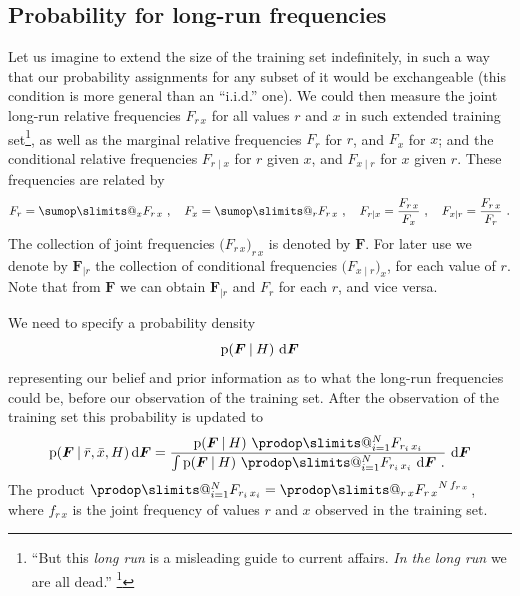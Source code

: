 \documentclass[\ifafour a4paper,12pt,\else a5paper,10pt,\fi%
onecolumn,oneside,article,%
british%
]{memoir}
\makeatletter
\theoremstyle{remark}
\theoremstyle{innote}
\def\sum{\DOTSI\sumop\slimits@}
\def\prod{\DOTSI\prodop\slimits@}
\newcommand*{\citep}{\footcites}
\newcommand*{\di}{\mathrm{d}}%
\newcommand*{\p}{\mathrm{p}}%
\renewcommand*{\|}[1][]{\nonscript\:#1\vert\nonscript\:\mathopen{}}
\renewcommand*{\=}{\TextOrMath\texteq\eq}
\newcommand*{\sect}{\S}%
\newcommand*{\q}{}%
\DeclareRobustCommand*{\q}{%
  \mathord{\mathpalette\bigcdot@{}}%
}
\newcommand*{\bigcdot@scalefactor}{0.7}
\newcommand*{\bigcdot@widthfactor}{1.5}
\newcommand*{\bigcdot@}[2]{%
  \sbox0{$#1\vcenter{}$}%
  \sbox2{$#1\cdot\m@th$}%
  \hbox to \bigcdot@widthfactor\wd2{%
    \hfil
    \raise\ht0\hbox{%
      \scalebox{\bigcdot@scalefactor}{%
        \lower\ht0\hbox{$#1\bullet\m@th$}%
      }%
    }%
    \hfil
  }%
}
\newcommand*{\rd}{\bar{r}}
\newcommand*{\xd}{\bar{x}}
\newcommand*{\yF}{\bm{F}}
\newcommand*{\yFr}{\yF_{\bm{\mid}r}}
\makeatother
\begin{document}
\subsection{Probability for long-run frequencies}
\label{sec:prob_longrun}

Let us imagine to extend the size of the training set indefinitely, in such
a way that our probability assignments for any subset of it would be
exchangeable (this condition is more general than an \enquote{i.i.d.} one).
We could then measure the joint long-run relative frequencies $F_{r\,x}$
for all values $r$ and $x$ in such extended training
set\footnote{\enquote{But this \emph{long run} is a misleading guide to
    current affairs. \emph{In the long run} we are all dead.}
  \citep[\sect~3.I, p.~65]{keynes1923_r2013}}, as well as the marginal
relative frequencies $F_{r\q}$ for $r$, and $F_{\q x}$ for $x$; and the
conditional relative frequencies $F_{r\mid x}$ for $r$ given $x$, and
$F_{x \mid r}$ for $x$ given $r$. These frequencies are related by
\begin{equation}
  \label{eq:frequencies_relations}
  F_{r\q}=\sum_{x} F_{r\,x}\ , \quad
  F_{\q x}=\sum_{r} F_{r\,x}\ ,\quad
  F_{r\mid x}=\frac{F_{r\,x}}{F_{\q x}}\ , \quad
  F_{x\mid r}=\frac{F_{r\,x}}{F_{r\q}}\ .
\end{equation}
The collection of joint frequencies $\bigl(F_{r\,x}\bigr)_{r\,x}$ is
denoted by $\yF$. For later use we denote by $\yFr$ the collection of
conditional frequencies $\bigl(F_{x\mid r}\bigr)_{x}$, for each value of
$r$. Note that from $\yF$ we can obtain $\yFr$ and $F_{r\q}$ for each $r$,
and vice versa.

\medskip

We need to specify a probability density
\begin{equation}\label{eq:prior_F}
\p(\yF \| H)\ \di\yF
\end{equation}
representing our belief and prior information as to what the long-run
frequencies could be, before our observation of the training set. After the
observation of the training set this probability is updated to
\begin{equation}
  \label{eq:post_prob_F}
  \p(\yF\|\rd,\xd, H)\,\di\yF =
  \frac{\p(\yF\| H)\ 
    \prod_{i=1}^{N} F_{r_{i}\,x_{i}}
  }{\int \p(\yF\| H)\ 
    \prod_{i=1}^{N} F_{r_{i}\,x_{i}}
              \ \di\yF \ .
  }\ \di\yF
\end{equation}
The product $\prod_{i=1}^{N} F_{r_{i}\,x_{i}} = \prod_{r\,x} {F_{r\,x}}^{N\, f_{r\,x}}$,
where $f_{r\,x}$ is the joint frequency of values $r$ and $x$ observed in
the training set.
\end{document}
